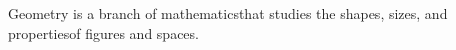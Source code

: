 \documentclass[preview]{standalone}
\begin{document}
\begin{center}
Geometry is a branch of mathematicsthat studies the shapes, sizes, and propertiesof figures and spaces.
\end{center}
\end{document}
